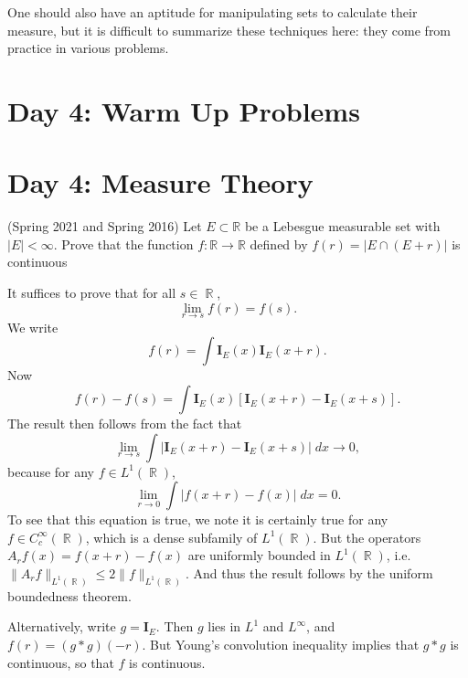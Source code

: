 \documentclass[answers]{exam}
\DeclareMathOperator{\RR}{\mathbb{R}}
\theoremstyle{problemstyle}
\newcommand{\1}[1]{\textbf{1}_{\left[#1\right]}} %
\def\R{\mathbb{R}} %
\begin{document}
%
One should also have an aptitude for manipulating sets to calculate their measure, but it is difficult to summarize these techniques here: they come from practice in various problems.

\begin{questions}    

\newpage
\section*{Day 4: Warm Up Problems}

\newpage
\section{Day 4: Measure Theory}

\question  (Spring 2021 and Spring 2016)
  Let $E\subset \R$ be a Lebesgue measurable set with $|E|<\infty$. Prove that the function $f:\R\to \R$ defined by $f(r)= |E\cap (E+r)|$ is continuous
\begin{solution}
    It suffices to prove that for all $s \in \RR$,
    \[ \lim_{r \to s} f(r) = f(s). \]
    We write
    \[ f(r) = \int \mathbf{I}_E(x) \mathbf{I}_E(x + r). \]
    Now
    \[ f(r) - f(s) = \int \mathbf{I}_E(x) [\mathbf{I}_E(x + r) - \mathbf{I}_E(x + s)]. \]
    The result then follows from the fact that
    \[ \lim_{r \to s} \int | \mathbf{I}_E(x + r) - \mathbf{I}_E(x + s)|\; dx \to 0, \]
    because for any $f \in L^1(\RR)$,
    \[ \lim_{r \to 0} \int |f(x + r) - f(x)|\; dx = 0. \]
    To see that this equation is true, we note it is certainly true for any $f \in C_c^\infty(\RR)$, which is a dense subfamily of $L^1(\RR)$. But the operators $A_r f(x) = f(x + r) - f(x)$ are uniformly bounded in $L^1(\RR)$, i.e. $\| A_r f \|_{L^1(\RR)} \leq 2 \| f \|_{L^1(\RR)}$. And thus the result follows by the uniform boundedness theorem.

    Alternatively, write $g = \mathbf{I}_E$. Then $g$ lies in $L^1$ and $L^\infty$, and $f(r) = (g * g)(-r)$. But Young's convolution inequality implies that $g * g$ is continuous, so that $f$ is continuous.

    \begin{comment}
    As $r \to s$, the integrand tends to zero pointwise. And moreover, the integrands are uniformly dominated by $2\mathbf{I}_E$, which is an integrable function. Thus the dominated convergence theorem implies that
    \[ \lim_{r \to s} f(r) - f(s) = 0. \]
    Thus $f$ is a continuous function.


\end{comment}
\end{solution}
\end{questions}
\end{document}
